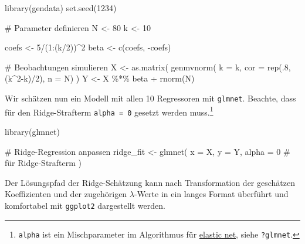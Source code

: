 \documentclass[
  a4paper,
  DIV=11,
  oneside]{scrreprt}
\newenvironment{Shaded}{\begin{snugshade}}{\end{snugshade}}
\newcommand{\AttributeTok}[1]{\textcolor[rgb]{0.40,0.45,0.13}{#1}}
\newcommand{\CommentTok}[1]{\textcolor[rgb]{0.37,0.37,0.37}{#1}}
\newcommand{\DecValTok}[1]{\textcolor[rgb]{0.68,0.00,0.00}{#1}}
\newcommand{\FunctionTok}[1]{\textcolor[rgb]{0.28,0.35,0.67}{#1}}
\newcommand{\NormalTok}[1]{\textcolor[rgb]{0.00,0.23,0.31}{#1}}
\newcommand{\OtherTok}[1]{\textcolor[rgb]{0.00,0.23,0.31}{#1}}
\newcommand{\SpecialCharTok}[1]{\textcolor[rgb]{0.37,0.37,0.37}{#1}}
\begin{document}
\begin{Shaded}
\begin{Highlighting}[]
\FunctionTok{library}\NormalTok{(gendata)}
\FunctionTok{set.seed}\NormalTok{(}\DecValTok{1234}\NormalTok{)}

\CommentTok{\# Parameter definieren}
\NormalTok{N }\OtherTok{\textless{}{-}} \DecValTok{80}
\NormalTok{k }\OtherTok{\textless{}{-}} \DecValTok{10}

\NormalTok{coefs }\OtherTok{\textless{}{-}} \DecValTok{5}\SpecialCharTok{/}\NormalTok{(}\DecValTok{1}\SpecialCharTok{:}\NormalTok{(k}\SpecialCharTok{/}\DecValTok{2}\NormalTok{))}\SpecialCharTok{\^{}}\DecValTok{2}
\NormalTok{beta }\OtherTok{\textless{}{-}} \FunctionTok{c}\NormalTok{(coefs, }\SpecialCharTok{{-}}\NormalTok{coefs)}

\CommentTok{\# Beobachtungen simulieren}
\NormalTok{X }\OtherTok{\textless{}{-}} \FunctionTok{as.matrix}\NormalTok{(}
  \FunctionTok{genmvnorm}\NormalTok{(}
    \AttributeTok{k =}\NormalTok{ k, }
    \AttributeTok{cor =} \FunctionTok{rep}\NormalTok{(.}\DecValTok{8}\NormalTok{, (k}\SpecialCharTok{\^{}}\DecValTok{2}\SpecialCharTok{{-}}\NormalTok{k)}\SpecialCharTok{/}\DecValTok{2}\NormalTok{), }
    \AttributeTok{n =}\NormalTok{ N)}
\NormalTok{  )}
\NormalTok{Y }\OtherTok{\textless{}{-}}\NormalTok{ X }\SpecialCharTok{\%*\%}\NormalTok{ beta }\SpecialCharTok{+} \FunctionTok{rnorm}\NormalTok{(N)}
\end{Highlighting}
\end{Shaded}

Wir schätzen nun ein Modell mit allen 10 Regressoren mit
\texttt{glmnet}. Beachte, dass für den Ridge-Strafterm
\texttt{alpha\ =\ 0} gesetzt werden muss.\footnote{\texttt{alpha} ist
  ein Mischparameter im Algorithmus für
  \href{https://en.wikipedia.org/wiki/Elastic_net_regularization}{elastic
  net}, siehe \texttt{?glmnet}.}

\begin{Shaded}
\begin{Highlighting}[]
\FunctionTok{library}\NormalTok{(glmnet)}

\CommentTok{\# Ridge{-}Regression anpassen}
\NormalTok{ridge\_fit }\OtherTok{\textless{}{-}} \FunctionTok{glmnet}\NormalTok{(}
  \AttributeTok{x =}\NormalTok{ X, }
  \AttributeTok{y =}\NormalTok{ Y, }
  \AttributeTok{alpha =} \DecValTok{0} \CommentTok{\# für Ridge{-}Strafterm}
\NormalTok{)}
\end{Highlighting}
\end{Shaded}

Der Lösungspfad der Ridge-Schätzung kann nach Transformation der
geschätzen Koeffizienten und der zugehörigen \(\lambda\)-Werte in ein
langes Format überführt und komfortabel mit \texttt{ggplot2} dargestellt
werden.
\end{document}
